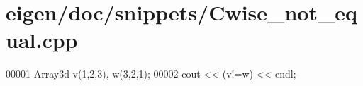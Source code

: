 \hypertarget{eigen_2doc_2snippets_2_cwise__not__equal_8cpp_source}{}\section{eigen/doc/snippets/\+Cwise\+\_\+not\+\_\+equal.cpp}
\label{eigen_2doc_2snippets_2_cwise__not__equal_8cpp_source}

\begin{DoxyCode}
00001 Array3d v(1,2,3), w(3,2,1);
00002 cout << (v!=w) << endl;
\end{DoxyCode}
